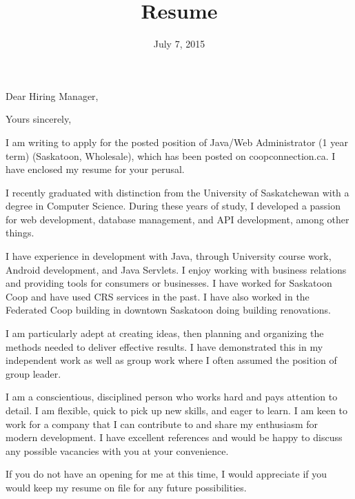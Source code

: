 \documentclass[11pt,letterpaper,sans]{moderncv}        %
\title{Resume}                               %
\makeatletter
\renewcommand*{\makeletterclosing}{
  \@closing\\[2em]%
  {\bfseries\@firstname~\@lastname}%
  \ifthenelse{\isundefined{\@enclosure}}{}{%
    \\%
    \vfil%
    {\color{color2}\itshape\enclname: \@enclosure}}%
    \vfil}
\makeatother
\begin{document}
\date{July 7, 2015}
\opening{Dear Hiring Manager,}
\closing{Yours sincerely,}
\makelettertitle

I am writing to apply for the posted position of Java/Web Administrator (1 year term) (Saskatoon, Wholesale), which has been posted on coopconnection.ca. I have enclosed my resume for your perusal.

I recently graduated with distinction from the University of Saskatchewan with a degree in Computer Science. During these years of study, I developed a passion for web development, database management, and API development, among other things.

I have experience in development with Java, through University course work, Android development, and Java Servlets. I enjoy working with business relations and providing tools for consumers or businesses. I have worked for Saskatoon Coop and have used CRS services in the past. I have also worked in the Federated Coop building in downtown Saskatoon doing building renovations.

I am particularly adept at creating ideas, then planning and organizing the methods needed to deliver effective results. I have demonstrated this in my independent work as well as group work where I often assumed the position of group leader.

I am a conscientious, disciplined person who works hard and pays attention to detail. I am flexible, quick to pick up new skills, and eager to learn. I am keen to work for a company that I can contribute to and share my enthusiasm for modern development. I have excellent references and would be happy to discuss any possible vacancies with you at your convenience.

If you do not have an opening for me at this time, I would appreciate if you would keep my resume on file for any future possibilities.

\makeletterclosing


\clearpage
\makecvtitle
\vspace*{-1cm} %
\end{document}
